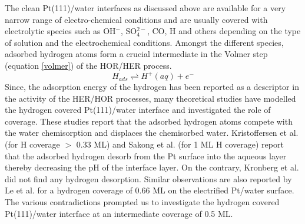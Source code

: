 The clean Pt(111)/water interfaces as discussed above are available for a very narrow range of electro-chemical conditions\cite{gross2022ab} and are usually covered with electrolytic species\cite{gross2022ab} such as OH$^-$, SO$_4^{2-}$, CO, H and others depending on the type of solution and the electrochemical conditions. Amongst the different species, adsorbed hydrogen atoms form a crucial intermediate in the Volmer step (equation \ref{volmer}) of the HOR/HER process.
\begin{equation}
    \label{volmer}
    H_{ads} \rightleftharpoons H^+(aq) + e^-
\end{equation}
Since, the adsorption energy of the hydrogen has been reported as a descriptor in the activity of the HER/HOR processes, many theoretical studies\cite{kristoffersen2018oh,kronberg2020coupling,le2021modeling,sakong2018electric} have modelled the hydrogen covered Pt(111)/water interface and investigated the role of coverage. These studies report that the adsorbed hydrogen atoms compete with the water chemisorption and displaces the chemisorbed water. Kristoffersen et al.\cite{kristoffersen2018oh} (for H coverage $>$ 0.33 ML) and Sakong et al.\cite{sakong2018electric} (for 1 ML H coverage) report that the adsorbed hydrogen desorb from the Pt surface into the aqueous layer thereby decreasing the pH of the interface layer. On the contrary, Kronberg et al.\cite{kronberg2020coupling} did not find any hydrogen desorption. Similar observations are also reported by Le et al.\cite{le2021modeling} for a hydrogen coverage of 0.66 ML on the electrified Pt/water surface. The various contradictions prompted us to investigate the hydrogen covered Pt(111)/water interface at an intermediate coverage of 0.5 ML. %
